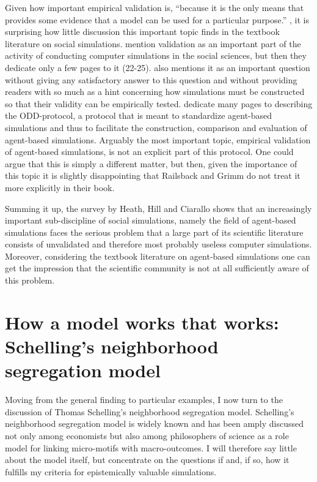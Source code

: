 \documentclass[12pt, english, a4paper]{article}
\begin{document}
Given how important empirical validation is, “because it is the only
means that provides some evidence that a model can be used for a
particular purpose.” \citep[4.11]{heath-et-al:2009}, it is surprising
how little discussion this important topic finds in the textbook
literature on social simulations. \citet{gilbert-troitzsch:2005}
mention validation as an important part of the activity of conducting
computer simulations in the social sciences, but then they dedicate
only a few pages to it (22-25). \citet[98]{salamon:2011} also mentions
it as an important question without giving any satisfactory answer to
this question and without providing readers with so much as a hint
concerning how simulations must be constructed so that their validity
can be empirically tested. \citet{railsback-grimm:2011} dedicate many
pages to describing the ODD-protocol, a protocol that is meant to
standardize agent-based simulations and thus to facilitate the
construction, comparison and evaluation of agent-based simulations.
Arguably the most important topic, empirical validation of agent-based
simulations, is not an explicit part of this protocol.  One could
argue that this is simply a different matter, but then, given the
importance of this topic it is slightly disappointing that Railsback
and Grimm do not treat it more explicitly in their book.

Summing it up, the survey by Heath, Hill and Ciarallo shows that an
increasingly important sub-discipline of social simulations, namely
the field of agent-based simulations faces the serious problem that a
large part of its scientific literature consists of unvalidated and
therefore most probably useless computer simulations. Moreover,
considering the textbook literature on agent-based simulations one can
get the impression that the scientific community is not at all
sufficiently aware of this problem.


\section{How a model works that works: Schelling’s neighborhood segregation model}

Moving from the general finding to particular examples, I now turn to
the discussion of Thomas Schelling’s neighborhood segregation
model. Schelling’s neighborhood segregation model
\citep{schelling:1971} is widely known and has been amply discussed
not only among economists but also among philosophers of science as a
role model for linking micro-motifs with macro-outcomes. I will
therefore say little about the model itself, but concentrate on the
questions if and, if so, how it fulfills my criteria for epistemically
valuable simulations.
\end{document}
